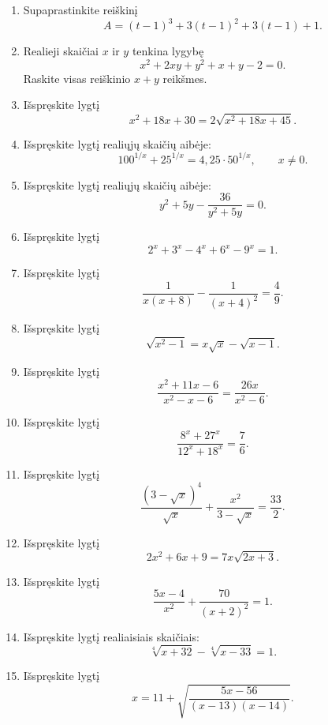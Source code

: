\documentclass[11pt,a4paper]{scrartcl}
\begin{document}
\begin{enumerate}
\renewcommand{\labelenumi}{\textbf{\theenumi.}}

    \item Supaprastinkite reiškinį
    \[
    A=(t-1)^3+3(t-1)^2+3(t-1)+1.
    \]

    \item Realieji skaičiai $x$ ir $y$ tenkina lygybę
    \[
    x^2+2xy+y^2+x+y-2=0.
    \]
    Raskite visas reiškinio $x+y$ reikšmes.

    \item Išspręskite lygtį
    \[
    x^2+18x+30
    =
    2\sqrt{x^2+18x+45}.
    \]

    \item Išspręskite lygtį realiųjų skaičių aibėje:
    \[
    100^{1/x}+25^{1/x}
    =
    4{,}25\cdot50^{1/x},
    \qquad x\ne0.
    \]

    \item Išspręskite lygtį realiųjų skaičių aibėje:
    \[
    y^2+5y-\frac{36}{y^2+5y}=0.
    \]

    \item Išspręskite lygtį
    \[
    2^x+3^x-4^x+6^x-9^x=1.
    \]

    \item Išspręskite lygtį
    \[
    \frac{1}{x(x+8)}
    -
    \frac{1}{(x+4)^2}
    =
    \frac49.
    \]

    \item Išspręskite lygtį
    \[
    \sqrt{x^2-1}
    =
    x\sqrt{x}-\sqrt{x-1}.
    \]

    \item Išspręskite lygtį
    \[
    \frac{x^2+11x-6}{x^2-x-6}
    =
    \frac{26x}{x^2-6}.
    \]

    \item Išspręskite lygtį
    \[
    \frac{8^x+27^x}{12^x+18^x}
    =
    \frac76.
    \]

    \item Išspręskite lygtį
    \[
    \frac{(3-\sqrt{x})^4}{\sqrt{x}}
    +
    \frac{x^2}{3-\sqrt{x}}
    =
    \frac{33}{2}.
    \]

    \item Išspręskite lygtį
    \[
    2x^2+6x+9
    =
    7x\sqrt{2x+3}.
    \]

    \item Išspręskite lygtį
    \[
    \frac{5x-4}{x^2}
    +
    \frac{70}{(x+2)^2}
    =
    1.
    \]

    \item Išspręskite lygtį realiaisiais skaičiais:
    \[
    \sqrt[4]{x+32}
    -
    \sqrt[4]{x-33}
    =
    1.
    \]

    \item Išspręskite lygtį
    \[
    x
    =
    11+
    \sqrt{
    \frac{5x-56}{(x-13)(x-14)}
    }.
    \]

\end{enumerate}
\end{document}
